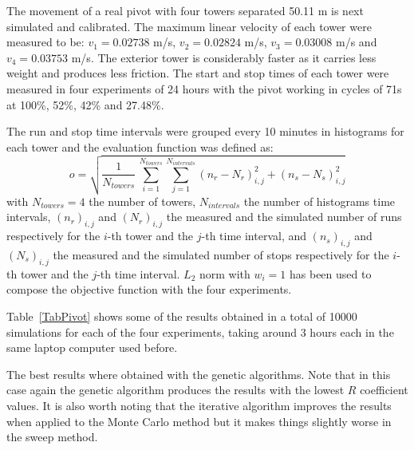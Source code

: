 \documentclass[review,authoryear]{elsarticle}
\newcommand{\EQ}[2]
{\begin{equation}#1\label{#2}\end{equation}}
\newcommand{\PA}[1]{\left(#1\right)}
\begin{document}
The movement of a real pivot with four towers separated 50.11 m is next simulated and calibrated. The maximum linear velocity of each tower were measured to be: $v_1=0.02738$ m/s, $v_2=0.02824$ m/s, $v_3=0.03008$ m/s and $v_4=0.03753$ m/s.
The exterior tower is considerably faster as it carries less weight and produces less friction.
The start and stop times of each tower were measured in four experiments of 24 hours with the pivot working in cycles of 71s at 100\%, 52\%, 42\% and 27.48\%.

The run and stop time intervals were grouped every 10 minutes in histograms for each tower and the evaluation function was defined as:
\EQ
{
	o=\sqrt{\frac{1}{N_{towers}}\,\sum_{i=1}^{N_{towers}}
	\sum_{j=1}^{N_{intervals}}\PA{n_r-N_r}_{i,j}^2+\PA{n_s-N_s}_{i,j}^2}
}{EqPivotObjective}
with $N_{towers}=4$ the number of towers, $N_{intervals}$ the number of
histograms time intervals, $\PA{n_r}_{i,j}$ and $\PA{N_r}_{i,j}$ the measured
and the simulated number of runs respectively for the $i$-th tower and the
$j$-th time interval, and $\PA{n_s}_{i,j}$ and $\PA{N_s}_{i,j}$ the measured
and the simulated number of stops respectively for the $i$-th tower and the
$j$-th time interval. $L_2$ norm with $w_i=1$ has been used to compose the
objective function with the four experiments.

Table~\ref{TabPivot} shows some of the results obtained in a total of 10000 simulations for each of the four experiments, taking around 3 hours each in the same laptop computer used before.

The best results where obtained with the genetic algorithms. Note that in this case again the genetic algorithm produces the results with the lowest $R$ coefficient values. It is also worth noting that the iterative algorithm improves the results when applied to the Monte Carlo method but it makes things slightly worse in the sweep method.
\end{document}

